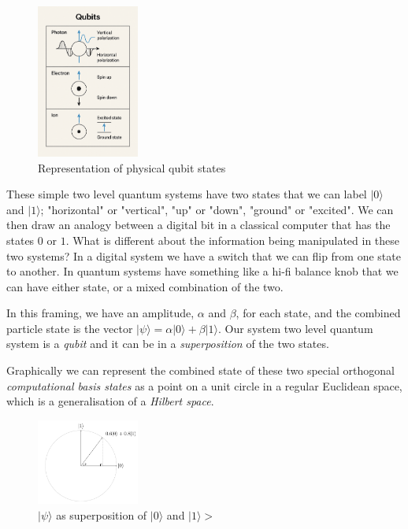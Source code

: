 \begin{figure}[ht]
	\begin{adjustbox}{center}
		\includegraphics[width=0.3\textwidth, inner]{figures/physical_qubits_2.png}
	\end{adjustbox}
	\caption{Representation of physical qubit states} %
\label{fig:phys_qubit}
\end{figure}

These simple two level quantum systems have two states that we can label $\lvert0\rangle$ and $\lvert1\rangle$;
"horizontal" or "vertical", "up" or "down", "ground" or "excited".
We can then draw an analogy between a digital bit in a classical computer that has the states $0$ or $1$.
What is different about the information being manipulated in these two systems?
In a digital system we have a switch that we can flip from one state to another.
In quantum systems have something like a hi-fi balance knob that we can have either state,
or a mixed combination of the two.

In this framing, we have an amplitude, $\alpha$ and $\beta$, for each state, 
and the combined particle state is the vector $\lvert\psi\rangle = \alpha \lvert0\rangle + \beta \lvert1\rangle$.
Our system two level quantum system is a \emph{qubit} and it can be in a \emph{superposition} of the two states.

Graphically we can represent the combined state of these two special orthogonal \emph{computational basis states} 
as a point on a unit circle in a regular Euclidean space, which is a generalisation of a \emph{Hilbert space}.  

\begin{figure}[ht] 
	\begin{adjustbox}{center}
		\includegraphics[width=0.3\textwidth, inner]{figures/unit-vector-2-d-hilbert-state.png}
	\end{adjustbox}
	\caption{$\lvert\psi\rangle$ as superposition of $\lvert0\rangle$ and $\lvert1\rangle>$ }
	\label{fig:2d_hilbert_space}
\end{figure}

